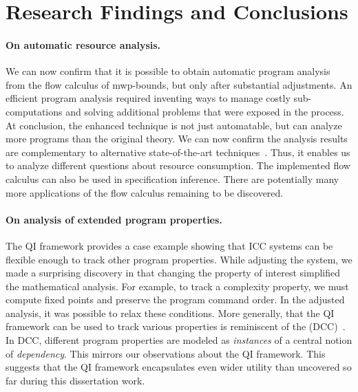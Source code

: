 \section{Research Findings and Conclusions}
\label{sec:aicc-discussion}

\paragraph*{On automatic resource analysis.} We can now confirm that it is
possible to obtain automatic program analysis from the flow calculus of
mwp-bounds, but only after substantial adjustments. An efficient program
analysis required inventing ways to manage costly sub-computations and solving
additional problems that were exposed in the process. At conclusion, the
enhanced technique is not just automatable, but can analyze more programs than
the original theory. We can now confirm the analysis results are complementary
to alternative state-of-the-art techniques~\cite[p. 5]{aubert2023b}. Thus, it
enables us to analyze different questions about resource consumption. The
implemented flow calculus can also be used in specification
inference. There are potentially many more applications of
the flow calculus remaining to be discovered.

\paragraph*{On analysis of extended program properties.} The QI framework
provides a case example showing that ICC systems can be flexible enough to track
other program properties. While adjusting the system, we made a surprising
discovery in that changing the property of interest simplified the mathematical
analysis. For example, to track a complexity property, we must compute fixed
points and preserve the program command order. In the adjusted analysis, it was
possible to relax these conditions. More generally, that the QI framework can be
used to track various properties is reminiscent of the  (DCC)~\cite{abadi1999b}. In DCC, different program properties are
modeled as \emph{instances} of a central notion of \emph{dependency}. This
mirrors our observations about the QI framework. This suggests that the QI
framework encapsulates even wider utility than uncovered so far during this
dissertation work.

